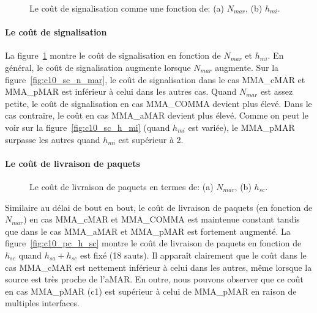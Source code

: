 \begin{figure}[h!]
\centering
{}
\caption[Le coût de signalisation.]{Le coût de signalisation comme une fonction de: (a) $N_{mar}$, (b) $h_{mi}$.}
\label{fig:c10_sc}
\end{figure}

\paragraph{Le coût de signalisation}
La figure~\ref{fig:c10_sc} montre le coût de signalisation en fonction de $ N_{mar} $ et $ h_ {mi} $. En général, le coût de signalisation augmente lorsque $ N_{mar} $ augmente. Sur la figure~\ref{fig:c10_sc_n_mar}, le coût de signalisation dans le cas MMA\_cMAR et MMA\_pMAR est inférieur à celui dans les autres cas. Quand $ N_{mar} $ est assez petite, le coût de signalisation en cas MMA\_COMMA devient plus élevé. Dans le cas contraire, le coût en cas MMA\_aMAR devient plus élevé. Comme on peut le voir sur la figure~\ref{fig:c10_sc_h_mi} (quand $ h_ {mi} $ est variée), le MMA\_pMAR surpasse les autres quand $ h_{mi} $ est supérieur à 2.


\paragraph{Le coût de livraison de paquets}
\begin{figure}[h!]
\centering
{}
\caption[Le coût de livraison de paquets.]{Le coût de livraison de paquets en termes de: (a) $N_{mar}$, (b) $h_{sc}$.}
\label{fig:c10_pc}
\end{figure}
	
Similaire au délai de bout en bout, le coût de livraison de paquets (en fonction de $ N_{mar} $) en cas MMA\_cMAR et MMA\_COMMA est maintenue constant tandis que dans le cas MMA\_aMAR et MMA\_pMAR est fortement augmenté. La figure~\ref {fig:c10_pc_h_sc} montre le coût de livraison de paquets en fonction de $ h_{sc} $ quand $ h_{sa} + h_{sc} $ est fixé (18 sauts). Il apparaît clairement que le coût dans le cas MMA\_cMAR est nettement inférieur à celui dans les autres, même lorsque la source est très proche de l'aMAR. En outre, nous pouvons observer que ce coût en cas MMA\_pMAR (c1) est supérieur à celui de MMA\_pMAR en raison de multiples interfaces.


